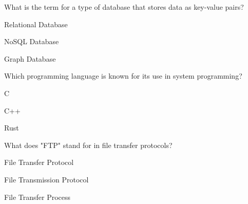 \begin{enhancedmcq}{What is the term for a type of database that stores data as key-value pairs?}
\item Relational Database
\item NoSQL Database
\item Graph Database

\end{enhancedmcq}
\begin{enhancedmcq}{Which programming language is known for its use in system programming?}
\item C
\item C++
\item Rust

\end{enhancedmcq}
\begin{enhancedmcq}{What does "FTP" stand for in file transfer protocols?}
\item File Transfer Protocol
\item File Transmission Protocol
\item File Transfer Process
\end{enhancedmcq}